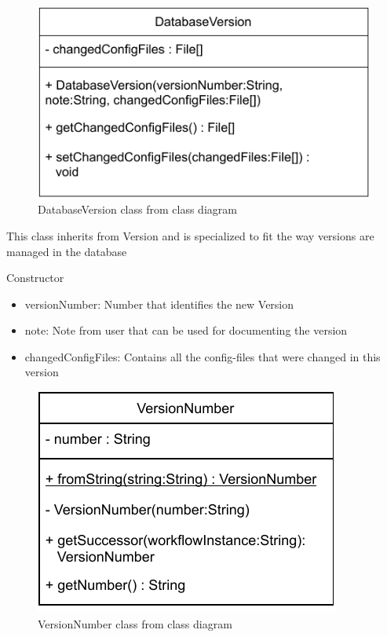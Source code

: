 \begin{figure}[h]
\centerline{\includegraphics[scale=1]{res/Klassen/DatabaseVersion.pdf}}
\caption{DatabaseVersion class from class diagram}
\end{figure}

This class inherits from Version and is specialized to fit the way versions are managed in the database
\begin{methodenv}{Constructor}



\begin{itemize}
	\item{versionNumber:}
	Number that identifies the new Version
	\item{note:}
	Note from user that can be used for documenting the version
	\item{changedConfigFiles:}
	Contains all the config-files that were changed in this version
\end{itemize}
\end{methodenv}


\begin{figure}[h]
\centerline{\includegraphics[scale=1]{res/Klassen/VersionNumber.pdf}}
\caption{VersionNumber class from class diagram}
\end{figure}

